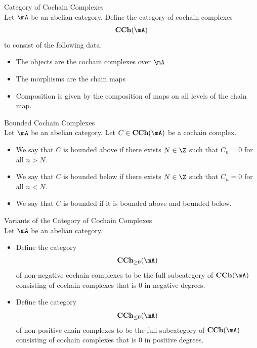 \documentclass[a4paper]{article}
\begin{document}
\begin{defn}{Category of Cochain Complexes}{}\\
Let $\mA$ be an abelian category. Define the category of cochain complexes $$\bold{CCh}(\mA)$$ to consist of the following data. 
\begin{itemize}
\item The objects are the cochain complexes over $\mA$
\item The morphisms are the chain maps
\item Composition is given by the composition of maps on all levels of the chain map. 
\end{itemize}
\end{defn}

\begin{defn}{Bounded Cochain Complexes}{}\\
Let $\mA$ be an abelian category. Let $C\in\bold{CCh}(\mA)$ be a cochain complex. 
\begin{itemize}
\item We say that $C$ is bounded above if there exists $N\in\Z$ such that $C_n=0$ for all $n>N$. 
\item We say that $C$ is bounded below if there exists $N\in\Z$ such that $C_n=0$ for all $n<N$. 
\item We say that $C$ is bounded if it is bounded above and bounded below. 
\end{itemize}
\end{defn}

\begin{defn}{Variants of the Category of Cochain Complexes}{}\\
Let $\mA$ be an abelian category. 
\begin{itemize}
\item Define the category $$\bold{CCh}_{\geq 0}(\mA)$$ of non-negative cochain complexes to be the full subcategory of $\bold{CCh}(\mA)$ consisting of cochain complexes that is $0$ in negative degrees. 
\item Define the category $$\bold{CCh}_{\leq 0}(\mA)$$ of non-positive chain complexes to be the full subcategory of $\bold{CCh}(\mA)$ consisting of cochain complexes that is $0$ in positive degrees. 
\end{itemize}
\end{defn}
\end{document}
